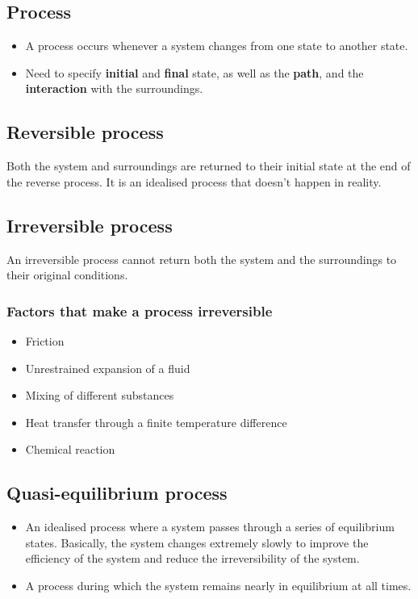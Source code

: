 \documentclass[11pt]{article}
\begin{document}
\subsection{Process}
\label{sec:org2391191}
\begin{itemize}
\item A process occurs whenever a system changes from one state to another state.
\item Need to specify \textbf{initial} and \textbf{final} state, as well as the \textbf{path}, and the \textbf{interaction} with the surroundings.
\end{itemize}

\subsection{Reversible process}
\label{sec:orge0d2d75}
Both the system and surroundings are returned to their initial state at the end of the reverse process. It is an idealised process that doesn't happen in reality.

\newpage

\subsection{Irreversible process}
\label{sec:org48a37c2}
An irreversible process cannot return both the system and the surroundings to their original conditions.

\subsubsection{Factors that make a process irreversible}
\label{sec:orgec32d6d}
\begin{itemize}
\item Friction
\item Unrestrained expansion of a fluid
\item Mixing of different substances
\item Heat transfer through a finite temperature difference
\item Chemical reaction
\end{itemize}

\subsection{Quasi-equilibrium process}
\label{sec:org9548fc5}
\begin{itemize}
\item An idealised process where a system passes through a series of equilibrium states. Basically, the system changes extremely slowly to improve the efficiency of the system and reduce the irreversibility of the system.
\item A process during which the system remains nearly in equilibrium at all times.
\end{itemize}
\end{document}
